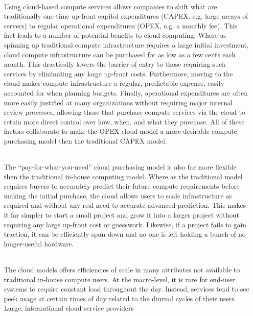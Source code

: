 \begin{packed_desc}
\item[OPEX vs CAPEX] \hfill \\ Using cloud-based compute services
  allows companies to shift what are traditionally one-time up-front
  capitol expenditures (CAPEX, e.g. large arrays of servers) to
  regular operational expenditures (OPEX, e.g. a monthly fee). This
  fact leads to a number of potential benefits to cloud
  computing. Where as spinning up traditional compute infrastructure
  requires a large initial investment, cloud compute infrastructure
  can be purchased for as low as a few cents each month. This
  drastically lowers the barrier of entry to those requiring such
  services by eliminating any large up-front costs. Furthermore,
  moving to the cloud makes compute infrastructure a regular,
  predictable expense, easily accounted for when planning
  budgets. Finally, operational expenditures are often more easily
  justified at many organizations without requiring major internal
  review processes, allowing those that purchase compute services via
  the cloud to retain more direct control over how, when, and what
  they purchase. All of these factors collaborate to make the OPEX
  cloud model a more desirable compute purchasing model then the
  traditional CAPEX model.
\item[Flexibility] \hfill \\ The ``pay-for-what-you-need'' cloud
  purchasing model is also far more flexible then the traditional
  in-house computing model. Where as the traditional model requires
  buyers to accurately predict their future compute requirements
  before making the initial purchase, the cloud allows users to scale
  infrastructure as required and without any real need to accurate
  advanced prediction. This makes it far simpler to start a small
  project and grow it into a larger project without requiring any
  large up-front cost or guesswork. Likewise, if a project fails to
  gain traction, it can be efficiently spun down and no one is left
  holding a bunch of no-longer-useful hardware.
\item[Efficiency] \hfill \\ The cloud models offers efficiencies of
  scale in many attributes not available to traditional in-house
  compute users. At the macro-level, it is rare for end-user systems
  to require constant load throughout the day. Instead, services tend
  to see peek usage at certain times of day related to the diurnal
  cycles of their users. Large, international cloud service providers

\end{packed_desc}
